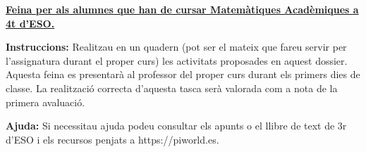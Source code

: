 \documentclass{article}
\begin{document}
  \pagestyle{blocfancy}
  \setcounter{myenumi}{0}
  \begin{center}
  	\large
  	\textbf{\underline{
  			Feina per als alumnes que han de cursar Matemàtiques Acadèmiques a 4t d'ESO.
  		}
  	}
  \end{center}
  
  
  
  \begin{blueshaded}
  	\textbf{Instruccions: } Realitzau en un quadern (pot ser el mateix que fareu servir per l'assignatura durant el proper curs) les activitats proposades en aquest dossier. Aquesta feina es presentarà al professor del proper curs durant els primers dies de classe. La realització correcta d'aquesta tasca serà valorada com a nota de la primera avaluació.
  	
  	\textbf{Ajuda: } Si necessitau ajuda podeu consultar els apunts o el llibre de text de 3r d'ESO  i els recursos penjats a https://piworld.es. 
  \end{blueshaded}
  
\end{document}
